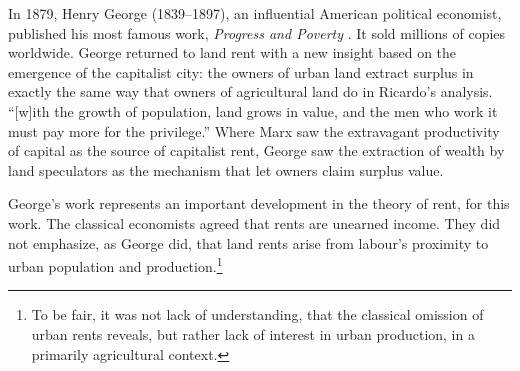 In 1879, Henry George (1839--1897), an influential American political economist, published his most famous work, \textit{Progress and Poverty} \cite{georgeProgressPovertyInquiry1973}. It sold millions of copies worldwide. George returned to land rent with a new insight based on the emergence of the capitalist city: the owners of urban land extract surplus in exactly the same way that owners of agricultural land do in Ricardo's analysis. ``[w]ith the growth of population, land grows in value, and the men who work it must pay more for the privilege.''  Where Marx saw the extravagant productivity of capital as the source of capitalist rent, George saw the extraction of wealth by land speculators as the mechanism that let owners claim surplus value. %

George's work represents an important development in the theory of rent, for this work. The classical economists agreed that rents are unearned income. They did not emphasize, as George did, that land rents arise from labour's proximity to urban population and production.\footnote{To be fair, it was not lack of understanding, that the classical omission of urban rents reveals, but rather lack of interest in urban production, in a primarily agricultural context.} %


